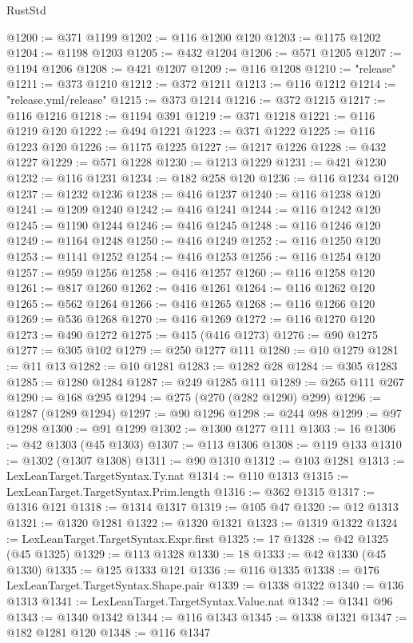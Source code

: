 \begin{lexlean}{RustStd}
\begin{coremodule}
@1200 := @371 @1199
@1202 := @116 @1200 @120
@1203 := @1175 @1202
@1204 := @1198 @1203
@1205 := @432 @1204
@1206 := @571 @1205
@1207 := @1194 @1206
@1208 := @421 @1207
@1209 := @116 @1208
@1210 := "release"
@1211 := @373 @1210
@1212 := @372 @1211
@1213 := @116 @1212
@1214 := "release.yml/release"
@1215 := @373 @1214
@1216 := @372 @1215
@1217 := @116 @1216
@1218 := @1194 @391
@1219 := @371 @1218
@1221 := @116 @1219 @120
@1222 := @494 @1221
@1223 := @371 @1222
@1225 := @116 @1223 @120
@1226 := @1175 @1225
@1227 := @1217 @1226
@1228 := @432 @1227
@1229 := @571 @1228
@1230 := @1213 @1229
@1231 := @421 @1230
@1232 := @116 @1231
@1234 := @182 @258 @120
@1236 := @116 @1234 @120
@1237 := @1232 @1236
@1238 := @416 @1237
@1240 := @116 @1238 @120
@1241 := @1209 @1240
@1242 := @416 @1241
@1244 := @116 @1242 @120
@1245 := @1190 @1244
@1246 := @416 @1245
@1248 := @116 @1246 @120
@1249 := @1164 @1248
@1250 := @416 @1249
@1252 := @116 @1250 @120
@1253 := @1141 @1252
@1254 := @416 @1253
@1256 := @116 @1254 @120
@1257 := @959 @1256
@1258 := @416 @1257
@1260 := @116 @1258 @120
@1261 := @817 @1260
@1262 := @416 @1261
@1264 := @116 @1262 @120
@1265 := @562 @1264
@1266 := @416 @1265
@1268 := @116 @1266 @120
@1269 := @536 @1268
@1270 := @416 @1269
@1272 := @116 @1270 @120
@1273 := @490 @1272
@1275 := @415 (@416 @1273)
@1276 := @90 @1275
@1277 := @305 @102
@1279 := @250 @1277 @111
@1280 := @10 @1279
@1281 := @11 @13
@1282 := @10 @1281
@1283 := @1282 @28
@1284 := @305 @1283
@1285 := @1280 @1284
@1287 := @249 @1285 @111
@1289 := @265 @111 @267
@1290 := @168 @295
@1294 := @275 (@270 (@282 @1290) @299)
@1296 := @1287 (@1289 @1294)
@1297 := @90 @1296
@1298 := @244 @98
@1299 := @97 @1298
@1300 := @91 @1299
@1302 := @1300 @1277 @111
@1303 := 16
@1306 := @42 @1303 (@45 @1303)
@1307 := @113 @1306
@1308 := @119 @133
@1310 := @1302 (@1307 @1308)
@1311 := @90 @1310
@1312 := @103 @1281
@1313 := LexLeanTarget.TargetSyntax.Ty.nat
@1314 := @110 @1313
@1315 := LexLeanTarget.TargetSyntax.Prim.length
@1316 := @362 @1315
@1317 := @1316 @121
@1318 := @1314 @1317
@1319 := @105 @47
@1320 := @12 @1313
@1321 := @1320 @1281
@1322 := @1320 @1321
@1323 := @1319 @1322
@1324 := LexLeanTarget.TargetSyntax.Expr.first
@1325 := 17
@1328 := @42 @1325 (@45 @1325)
@1329 := @113 @1328
@1330 := 18
@1333 := @42 @1330 (@45 @1330)
@1335 := @125 @1333 @121
@1336 := @116 @1335
@1338 := @176 LexLeanTarget.TargetSyntax.Shape.pair
@1339 := @1338 @1322
@1340 := @136 @1313
@1341 := LexLeanTarget.TargetSyntax.Value.nat
@1342 := @1341 @96
@1343 := @1340 @1342
@1344 := @116 @1343
@1345 := @1338 @1321
@1347 := @182 @1281 @120
@1348 := @116 @1347

\end{coremodule}
\end{lexlean}
